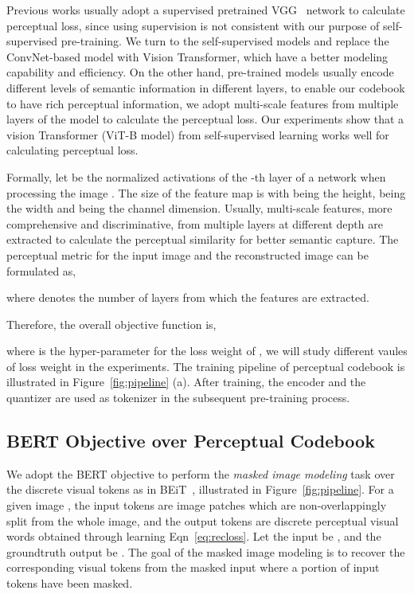 \documentclass[letterpaper]{article} \usepackage{aaai23}  \usepackage{times}  \usepackage{helvet}  \usepackage{courier}  \usepackage[hyphens]{url}  \usepackage{graphicx} \urlstyle{rm} \def\UrlFont{\rm}  \usepackage{natbib}  \usepackage{caption} \frenchspacing  \setlength{\pdfpagewidth}{8.5in}  \setlength{\pdfpageheight}{11in}  \usepackage{algorithm}
\begin{document}
Previous works usually adopt a supervised pretrained VGG~\cite{simonyan2014very} network to calculate perceptual loss, since using supervision is not consistent with our purpose of self-supervised pre-training. We turn to the self-supervised models and replace the ConvNet-based model with Vision Transformer, which have a better modeling capability and efficiency. On the other hand, pre-trained models usually encode different levels of semantic information in different layers, to enable our codebook to have rich perceptual information, we adopt multi-scale features from multiple layers of the model to calculate the perceptual loss. Our experiments show that a vision Transformer (ViT-B model) from self-supervised learning works well for calculating perceptual loss.

Formally, let  be the normalized activations of the -th layer of a network  when processing the image .
The size of the feature map is  with  being the height,  being the width and  being the channel dimension. 
Usually, multi-scale features, more comprehensive and discriminative, from multiple layers at different depth are extracted to calculate the perceptual similarity for better semantic capture. The perceptual metric for the input image  and the reconstructed image  can be formulated as,

where  denotes the number of layers from which the features are extracted.

Therefore, the overall objective function is,

where  is the hyper-parameter for the loss weight of , we will study different vaules of loss weight  in the experiments.
The training pipeline of perceptual codebook is illustrated in Figure~\ref{fig:pipeline} (a).
After training, the encoder and the quantizer are used as tokenizer in the subsequent pre-training process.

\subsection{BERT Objective over Perceptual Codebook}
We adopt the BERT objective to perform the \emph{masked image modeling} task over the discrete  visual tokens as in BEiT~\cite{bao2021beit}, illustrated in Figure~\ref{fig:pipeline}.
For a given image , 
the input tokens are image patches which are non-overlappingly split from the whole image,
and the output tokens are discrete perceptual visual words obtained through learning Eqn~\ref{eq:recloss}.
Let the input be , and the groundtruth output be
.
The goal of the masked image modeling is to recover the corresponding visual tokens from the masked input where a portion of input tokens have been masked. 
\end{document}
